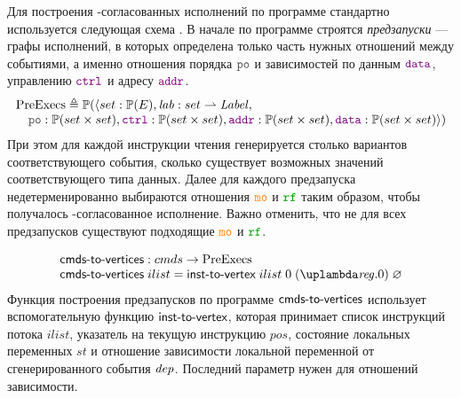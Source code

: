 Для построения \ARM-согласованных исполнений по программе стандартно
используется следующая схема \cite{Vafeiadis-Narayan:OOPSLA13}.
В начале по программе строятся \emph{предзапуски} --- графы исполнений, в которых определена
только часть нужных отношений между событиями, а именно отношения порядка $\lPO$ и зависимостей
по данным $\lDATA$, управлению $\lCTRL$ и адресу $\lADDR$.
\[
\inarr{
  \PreExecutions \defeq \Pset(\langle set : \Pset(E), \lab : set \rightharpoonup \Label, \\
   \quad \lPO : \Pset(set \times set), \lCTRL : \Pset(set \times set),
         \lADDR : \Pset(set \times set), \lDATA : \Pset(set \times set) \rangle) \\
}\]
При этом для каждой инструкции чтения
генерируется столько вариантов соответствующего события, сколько существует возможных значений
соответствующего типа данных.
Далее для каждого предзапуска недетерменированно выбираются отношения $\lCO$ и $\lRF$
таким образом, чтобы получалось \ARM-согласованное исполнение. Важно отменить, что не для всех предзапусков
существуют подходящие $\lCO$ и $\lRF$.

\[
\inarr{
  \cmdsToVrtxs : \Carm \rightarrow \PreExecutions \\
  \cmdsToVrtxs \; ilist = \instToVrtx \; ilist \; 0 \; (\lambda \reg. 0) \; \emptyset \\
}\]
Функция построения предзапусков по программе $\textup{\sf cmds-to-vertices}$ использует вспомогательную функцию $\textup{\sf inst-to-vertex}$,
которая принимает список инструкций потока $ilist$, указатель на текущую инструкцию $pos$,
состояние локальных переменных $st$ и отношение зависимости локальной переменной от сгенерированного события $\mathit{dep}$.
Последний параметр нужен для отношений зависимости.

